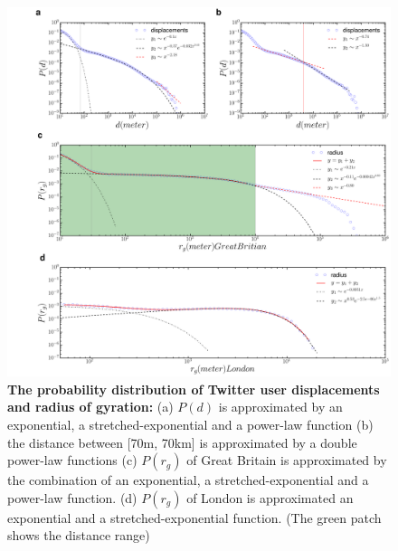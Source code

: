 \documentclass[]{tGIS2e}
\begin{document}
\begin{figure}[ht]
\includegraphics[width=1.0\linewidth]{./figure/S4_radius_displacement_3}
\caption{{\bf The probability distribution of Twitter user displacements and radius of gyration:} (a) $P(d)$ is approximated by an exponential, a stretched-exponential and a power-law function (b) the distance between [70m, 70km] is approximated by a double power-law functions (c) $P(r_g)$ of Great Britain is approximated by the combination of an exponential, a stretched-exponential and a power-law function. (d) $P(r_g)$ of London is approximated an exponential and a stretched-exponential function. (The green patch shows the distance range)}
\label{S4_Fig}
\end{figure}
\end{document}
